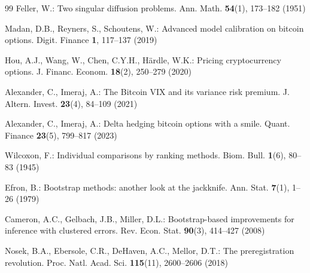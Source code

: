 \documentclass[runningheads]{llncs}
\begin{document}
\begin{thebibliography}{99}
Feller, W.: Two singular diffusion problems. Ann. Math. \textbf{54}(1),
173--182 (1951)

Madan, D.B., Reyners, S., Schoutens, W.: Advanced model calibration on bitcoin
options. Digit. Finance \textbf{1}, 117--137 (2019)

Hou, A.J., Wang, W., Chen, C.Y.H., H\"{a}rdle, W.K.: Pricing cryptocurrency
options. J. Financ. Econom. \textbf{18}(2), 250--279 (2020)

Alexander, C., Imeraj, A.: The Bitcoin VIX and its variance risk premium.
J. Altern. Invest. \textbf{23}(4), 84--109 (2021)

Alexander, C., Imeraj, A.: Delta hedging bitcoin options with a smile.
Quant. Finance \textbf{23}(5), 799--817 (2023)

Wilcoxon, F.: Individual comparisons by ranking methods. Biom. Bull.
\textbf{1}(6), 80--83 (1945)

Efron, B.: Bootstrap methods: another look at the jackknife. Ann. Stat.
\textbf{7}(1), 1--26 (1979)

Cameron, A.C., Gelbach, J.B., Miller, D.L.: Bootstrap-based improvements for
inference with clustered errors. Rev. Econ. Stat. \textbf{90}(3), 414--427
(2008)

Nosek, B.A., Ebersole, C.R., DeHaven, A.C., Mellor, D.T.: The preregistration
revolution. Proc. Natl. Acad. Sci. \textbf{115}(11), 2600--2606 (2018)

\end{thebibliography}
\end{document}
